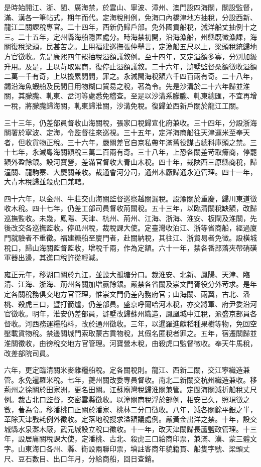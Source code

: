 \begin{pinyinscope}
是時始開江、浙、閩、廣海禁，於雲山、寧波、漳州、澳門設四海關，關設監督，滿、漢各一筆帖式，期年而代。定海稅則例，免海口內橋津地方抽稅，分設西新、龍江二關課稅專官。二十四年，西新仍歸戶部。免外國貢船稅，減洋船丈抽例十之三。二十五年，定州縣海船隱匿處分。時海禁初開，沿海漁船，州縣既徵漁課，海關復稅梁頭，民甚苦之。上用福建巡撫張仲舉言，定漁船五尺以上，梁頭稅統歸地方官徵收。先是康熙四年罷抽稅溢額議敘例。至十四年，又定溢額多寡，分別加級升用。及是，上以苛取累商，復停止溢額議敘。二十六年，滸墅監督桑額徵收溢額二萬一千有奇，上以擾累閭閻，罪之。永減閩海稅額六千四百兩有奇。二十八年，蠲沿海魚蝦船及民間日用物糊口貿易之稅，著為令。先是沙溝於二十六年歸並淮關，其朦朧、軋東、岔河等處悉免稽查。至是以沙溝系朦朧、軋東總匯，不宜再增一稅，將朦朧歸海關，軋東歸淮關，沙溝免稅。復歸並西新戶關於龍江工關。

三十三年，仍差部員督收山海關稅，張家口稅歸宣化府兼收。三十四年，分設浙海關署於寧波、定海，令監督往來巡視。三十五年，定洋海商船往天津運米至奉天者，但收貨物正稅。三十六年，嚴關差官自京私帶年滿舊役謀占總科庫頭之禁。三十七年，永減粵海關額稅三萬二百兩有奇。三十八年，上恐各關差苛取瘠商，停罷額外盈餘銀。設河寶營，差滿官督收大青山木稅。四十年，裁陜西三原縣商稅，歸潼關、龍駒寨、大慶關兼收。裁通會河分司，通州木廠歸通永道管理。四十一年，大青木稅歸並殺虎口兼轄。

四十六年，以金州、牛莊交山海關監督巡察越關漏稅。設渝關於重慶，歸川東道徵收木稅。四十七年，仍差工部司員督收荊關稅。五十三年，以臨清關稅缺額，改歸巡撫監收。未幾，鳳陽、天津、杭州、荊州、江海、浙海、淮安、板閘及淮關，先後改交各巡撫監收。停瓜州稅，裁稅課大使。定臺灣收泊江、浙等省商船，經過廈門就驗者不重徵。福建糖船至廈門者，赴關納稅，其往江、浙貿易者免徵。設橫城稅口，歸山海關監督監收，增稅千兩，作為定額。六十一年，禁各番部落夾帶硝磺軍器出邊，其進口稅許從輕減。

雍正元年，移湖口關於九江，並設大孤塘分口。裁淮安、北新、鳳陽、天津、臨清、江海、浙海、荊州各關加增贏餘銀。嚴禁各省關及崇文門胥役分外苛求。是年定各關稅務俱交地方官管理，惟崇文門仍差內務府官；山海關、兩翼，古北、潘桃、殺虎三口，暨打箭爐，仍差部員。盛京呼爾哈河木稅，亦交將軍、府尹委沿河官徵收。明年，淮安仍差部員，滸墅改歸蘇州織造，鳳凰城中江稅，派盛京部員各督收。河西務運糧船料，改於通州徵收。三年，以暹羅進獻稻種果樹等物，免回空壓載貨物稅。禁邊關城門索取蒙古貢物稅，其假名匿稅者罪之。五年，宿遷關歸並淮關徵收，由徬稅交地方官管理。河寶營木稅，由殺虎口監督徵收。奉天牛馬稅，改差部院司員。

六年，更定臨清關米麥雜糧船稅。定各關稅則。龍江、西新二關，交江寧織造兼管。永免暹羅米稅。七年，夔州關改委專員督收。南北二新關交杭州織造兼收。移荊州之徐關於田家洲，更名田關。江蘇廟灣稅歸淮關兼管。定閩海關減折船稅丈尺例。裁古北口監督，交密雲縣徵收。以潼關商稅浮於部例，相安已久，照現徵之數，著為令。移潘桃口正關於潘家、桃林二分口徵收。八年，減各關餘平銀之半，革除天津戥耗例外徵收。定落地稅搜求溢額議處例。嚴黃金出洋之禁。十年，設交城縣水泉灘木廠，武元城設立稅口徵收。十一年，改天津關歸長蘆鹽政管理。十三年，設居庸關稅課大使，定潘桃、古北、殺虎三口給商印票，兼滿、漢、蒙三體文字。山東海口各州、縣、衛設兩聯印票，填註客商年貌籍貫、船隻字號、梁頭丈尺、豆石數目、出口年月，分給商船，回日查銷。


\end{pinyinscope}
